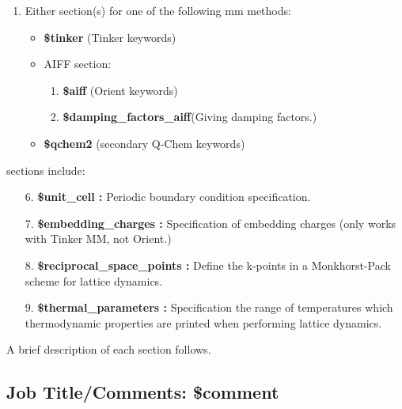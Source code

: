 \documentclass[11pt,letterpaper]{article}
\begin{document}
\begin{spacing}{1.0}
\begin{enumerate}
\item Either section(s) for one of the following mm methods:
  \begin{itemize} 
    \item {\bf \$tinker} (Tinker keywords) 
    \item AIFF section:
      \begin{enumerate}
        \item {\bf \$aiff} (Orient keywords)
        \item {\bf \$damping\_factors\_aiff}(Giving damping factors.)
        \end{enumerate}
    \item {\bf \$qchem2} (secondary Q-Chem keywords)
  \end{itemize} 

\end{enumerate}

 sections include:

\begin{enumerate}

\item[6.] {\bf \$unit\_cell :} Periodic boundary condition specification.\\

\item[7.] {\bf \$embedding\_charges :} Specification of embedding charges
  (only works with Tinker MM, not Orient.)\\


\item[8.] {\bf \$reciprocal\_space\_points :} Define the k-points in a    
Monkhorst-Pack scheme for lattice dynamics.\\

\item[9.] {\bf \$thermal\_parameters :} Specification the range of temperatures
which thermodynamic properties are printed when performing lattice dynamics.\\ 

\end{enumerate}

\noindent A brief description of each section follows.

\subsection{Job Title/Comments: \$comment} 


\end{spacing}
\end{document}
